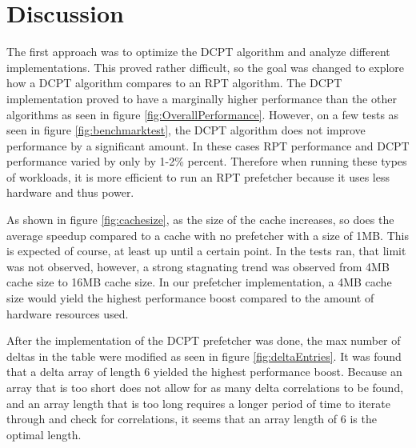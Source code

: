 \section{Discussion}\label{sec:discussion}
The first approach was to optimize the DCPT algorithm and analyze different implementations. This proved rather difficult, so the goal was changed to explore how a DCPT algorithm compares to an RPT algorithm. The DCPT implementation proved to have a marginally higher performance than the other algorithms as seen in figure \ref{fig:OverallPerformance}. However, on a few tests as seen in figure \ref{fig:benchmarktest}, the DCPT algorithm does not improve performance by a significant amount. In these cases RPT performance and DCPT performance varied by only by 1-2\% percent. Therefore when running these types of workloads, it is more efficient to run an RPT prefetcher because it uses less hardware and thus power.

As shown in figure \ref{fig:cachesize}, as the size of the cache increases, so does the average speedup compared to a cache with no prefetcher with a size of 1MB. This is expected of course, at least up until a certain point. In the tests ran, that limit was not observed, however, a strong stagnating trend was observed from 4MB cache size to 16MB cache size. In our prefetcher implementation, a 4MB cache size would yield the highest performance boost compared to the amount of hardware resources used.

After the implementation of the DCPT prefetcher was done, the max number of deltas in the table were modified as seen in figure \ref{fig:deltaEntries}. It was found that a delta array of length 6 yielded the highest performance boost. Because an array that is too short does not allow for as many delta correlations to be found, and an array length that is too long requires a longer period of time to iterate through and check for correlations, it seems that an array length of 6 is the optimal length.






